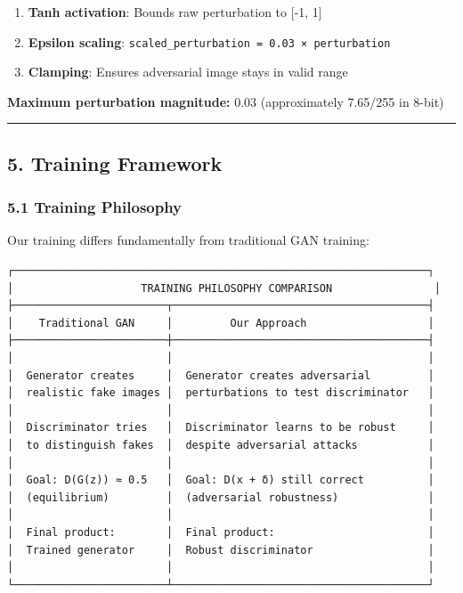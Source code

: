 \begin{enumerate}
\def\labelenumi{\arabic{enumi}.}
\tightlist
\item
  \textbf{Tanh activation}: Bounds raw perturbation to {[}-1, 1{]}
\item
  \textbf{Epsilon scaling}:
  \texttt{scaled\_perturbation\ =\ 0.03\ ×\ perturbation}
\item
  \textbf{Clamping}: Ensures adversarial image stays in valid range
\end{enumerate}

\textbf{Maximum perturbation magnitude:} 0.03 (approximately 7.65/255 in
8-bit)

\begin{center}\rule{0.5\linewidth}{0.5pt}\end{center}

\subsection{5. Training Framework}\label{training-framework}

\subsubsection{5.1 Training Philosophy}\label{training-philosophy}

Our training differs fundamentally from traditional GAN training:

\begin{verbatim}
┌─────────────────────────────────────────────────────────────────┐
│                    TRAINING PHILOSOPHY COMPARISON                │
├────────────────────────┬────────────────────────────────────────┤
│    Traditional GAN     │         Our Approach                   │
├────────────────────────┼────────────────────────────────────────┤
│                        │                                        │
│  Generator creates     │  Generator creates adversarial         │
│  realistic fake images │  perturbations to test discriminator   │
│                        │                                        │
│  Discriminator tries   │  Discriminator learns to be robust     │
│  to distinguish fakes  │  despite adversarial attacks           │
│                        │                                        │
│  Goal: D(G(z)) ≈ 0.5   │  Goal: D(x + δ) still correct          │
│  (equilibrium)         │  (adversarial robustness)              │
│                        │                                        │
│  Final product:        │  Final product:                        │
│  Trained generator     │  Robust discriminator                  │
│                        │                                        │
└────────────────────────┴────────────────────────────────────────┘
\end{verbatim}

